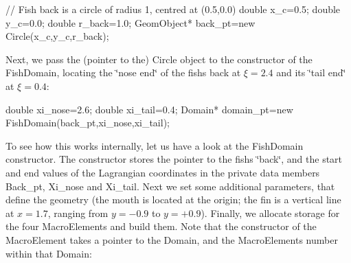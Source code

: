 \begin{DoxyCode}
\textcolor{comment}{// Fish back is a circle of radius 1, centred at (0.5,0.0)}
\textcolor{keywordtype}{double} x\_c=0.5;
\textcolor{keywordtype}{double} y\_c=0.0;
\textcolor{keywordtype}{double} r\_back=1.0;
GeomObject* back\_pt=\textcolor{keyword}{new} Circle(x\_c,y\_c,r\_back);
\end{DoxyCode}


Next, we pass the (pointer to the) {\ttfamily Circle} object to the constructor of the {\ttfamily Fish\+Domain}, locating the \char`\"{}nose end\char`\"{} of the fish\textquotesingle{}s back at $\xi=2.4$ and its \char`\"{}tail end\char`\"{} at $\xi=0.4$\+:


\begin{DoxyCode}
\textcolor{keywordtype}{double} xi\_nose=2.6; 
\textcolor{keywordtype}{double} xi\_tail=0.4; 
Domain* domain\_pt=\textcolor{keyword}{new} FishDomain(back\_pt,xi\_nose,xi\_tail);
\end{DoxyCode}


To see how this works internally, let us have a look at the {\ttfamily Fish\+Domain} constructor. The constructor stores the pointer to the fish\textquotesingle{}s \char`\"{}back\char`\"{}, and the start and end values of the Lagrangian coordinates in the private data members {\ttfamily Back\+\_\+pt}, {\ttfamily Xi\+\_\+nose} and {\ttfamily Xi\+\_\+tail}. Next we set some additional parameters, that define the geometry (the mouth is located at the origin; the fin is a vertical line at $ x=1.7$, ranging from $ y=-0.9$ to $ y=+0.9$). Finally, we allocate storage for the four {\ttfamily Macro\+Elements} and build them. Note that the constructor of the {\ttfamily Macro\+Element} takes a pointer to the Domain, and the {\ttfamily Macro\+Element\textquotesingle{}s} number within that {\ttfamily Domain\+:} 

